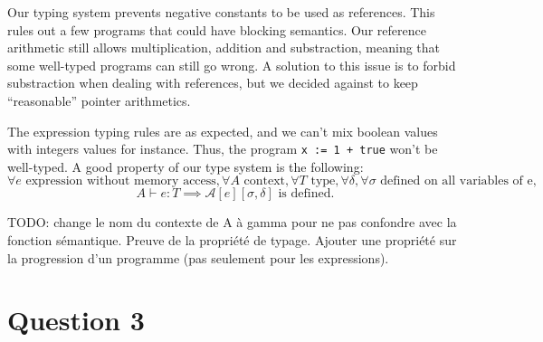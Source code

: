 \documentclass{article}
\newcommand{\Aa}[2]{\mathcal{A}\left[#1\right]\left[#2\right]}
\begin{document}
Our typing system prevents negative constants to be used as references.
This rules out a few programs that could have blocking semantics.
Our reference arithmetic still allows multiplication, addition and substraction, meaning that some well-typed programs can still go wrong.
A solution to this issue is to forbid substraction when dealing with references, but we decided against to keep ``reasonable'' pointer arithmetics.

The expression typing rules are as expected, and we can't mix boolean values with integers values for instance. Thus, the program \texttt{x := 1 + true} won't be well-typed. A good property of our type system is the following:\\

$\forall e\text{ expression without memory access}, \forall A\text{ context}, \forall T\text { type}, \forall \delta, \forall \sigma \text{ defined on all variables of e},$
$$A\vdash e : T\implies \Aa{e}{\sigma,\delta}\text{ is defined}.$$


TODO: change le nom du contexte de A à gamma pour ne pas confondre avec la fonction sémantique. Preuve de la propriété de typage. Ajouter une propriété sur la progression d'un programme (pas seulement pour les expressions).

\section*{Question 3}
\end{document}
